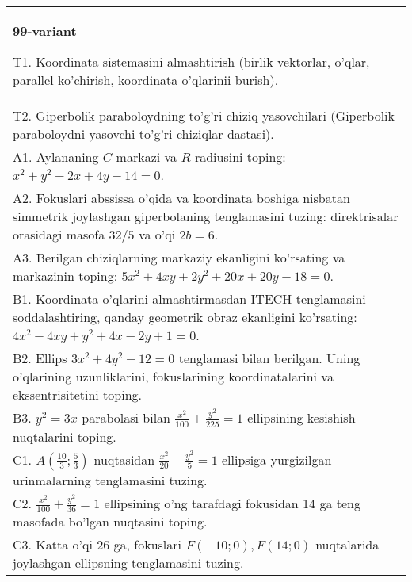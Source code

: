 \documentclass{article}
\begin{document}
\begin{tabular}{m{17cm}}
\textbf{99-variant}
\newline

T1. Koordinata sistemasini almashtirish (birlik vektorlar, o'qlar, parallel ko'chirish, koordinata o'qlarinii burish).\\

T2. Giperbolik paraboloydning to'g'ri chiziq yasovchilari (Giperbolik paraboloydni yasovchi to'g'ri chiziqlar dastasi).\\

A1. Aylananing $C$ markazi va $R$ radiusini toping: $x^2+y^2-2x+4y-14=0$.\\

A2. Fokuslari abssissa o'qida va koordinata boshiga nisbatan simmetrik joylashgan giperbolaning tenglamasini tuzing: direktrisalar orasidagi masofa $32/5$ va o'qi $2b=6$.\\

A3. Berilgan chiziqlarning markaziy ekanligini ko'rsating va markazinin toping: $5x^{2}+4xy+2y^{2}+20x+20y-18=0$.\\

B1. Koordinata o'qlarini almashtirmasdan ITECH tenglamasini soddalashtiring, qanday geometrik obraz ekanligini ko'rsating: $4x^{2} - 4xy + y^{2} + 4x - 2y + 1 = 0$.  \\

B2. Ellips $3x^{2} + 4y^{2} - 12 = 0$ tenglamasi bilan berilgan. Uning o'qlarining uzunliklarini, fokuslarining koordinatalarini va ekssentrisitetini toping.  \\

B3. $y^{2} = 3x$ parabolasi bilan $\frac{x^{2}}{100} + \frac{y^{2}}{225} = 1$ ellipsining kesishish nuqtalarini toping.  \\

C1. $A(\frac{10}{3};\frac{5}{3})$ nuqtasidan $\frac{x^{2}}{20} + \frac{y^{2}}{5} = 1$ ellipsiga yurgizilgan urinmalarning tenglamasini tuzing.  \\

C2. $\frac{x^{2}}{100} + \frac{y^{2}}{36} = 1$ ellipsining o'ng tarafdagi fokusidan 14 ga teng masofada bo'lgan nuqtasini toping.  \\

C3. Katta o'qi 26 ga, fokuslari $F( - 10;0), F(14;0)$ nuqtalarida joylashgan ellipsning tenglamasini tuzing.  \\

\end{tabular}
\vspace{1cm}
\end{document}
